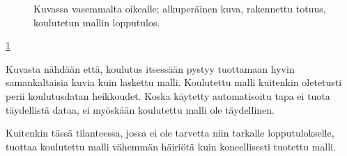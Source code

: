 \begin{figure}[h]
\centering
{}
\caption{Kuvassa vasemmalta oikealle; alkuperäinen kuva, rakennettu totuus, koulutetun mallin lopputulos.}
\label{fig:model}
\end{figure}

\ref{fig:model} 

Kuvasta nähdään että, koulutus itsessään pystyy tuottamaan hyvin samankaltaisia kuvia kuin laskettu malli. Koulutettu malli kuitenkin oletetusti perii koulutusdatan heikkoudet. Koska käytetty automatisoitu tapa ei tuota täydellistä dataa, ei myöskään koulutettu malli ole täydellinen. 

Kuitenkin tässä tilanteessa, jossa ei ole tarvetta niin tarkalle lopputulokselle, tuottaa koulutettu malli vähemmän häiriötä kuin koneellisesti tuotettu malli. 